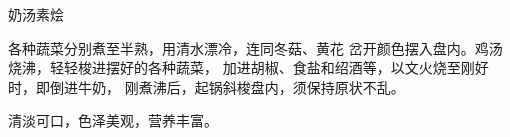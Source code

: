\begin{recipe}{奶汤素烩}

\ingredients





\cooking

各种蔬菜分别煮至半熟，用清水漂冷，连同冬菇、黄花 岔开颜色摆入盘内。鸡汤烧沸，轻轻梭进摆好的各种蔬菜， 加进胡椒、食盐和绍酒等，以文火烧至刚好时，即倒进牛奶， 刚煮沸后，起锅斜梭盘内，须保持原状不乱。

\notes

清淡可口，色泽美观，营养丰富。

\end{recipe}


